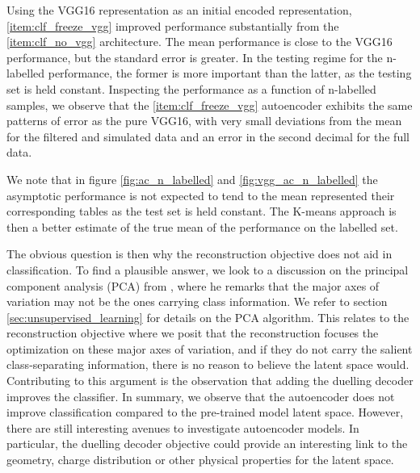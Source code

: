 Using the VGG16 representation as an initial encoded representation, \ref{item:clf_freeze_vgg} improved performance substantially from the \ref{item:clf_no_vgg} architecture. The mean performance is close to the VGG16 performance, but the standard error is greater. In the testing regime for the n-labelled performance, the former is more important than the latter, as the testing set is held constant. Inspecting the performance as a function of n-labelled samples, we observe that the \ref{item:clf_freeze_vgg} autoencoder exhibits the same patterns of error as the pure VGG16, with very small deviations from the mean for the filtered and simulated data and an error in the second decimal for the full data.

We note that in figure \ref{fig:ac_n_labelled} and \ref{fig:vgg_ac_n_labelled} the asymptotic performance is not expected to tend to the mean represented their corresponding tables as the test set is held constant. The K-means approach is then a better estimate of the true mean of the performance on the labelled set.

The obvious question is then why the reconstruction objective does not aid in classification. To find a plausible answer, we look to a discussion on the principal component analysis (PCA) from \cite{Jolliffe1982}, where he remarks that the major axes of variation may not be the ones carrying class information. We refer to section \ref{sec:unsupervised_learning} for details on the PCA algorithm. This relates to the reconstruction objective where we posit that the reconstruction focuses the optimization on these major axes of variation, and if they do not carry the salient class-separating information, there is no reason to believe the latent space would. Contributing to this argument is the observation that adding the duelling decoder improves the classifier. In summary, we observe that the autoencoder does not improve classification compared to the pre-trained model latent space. However, there are still interesting avenues to investigate autoencoder models. In particular, the duelling decoder objective could provide an interesting link to the geometry, charge distribution or other physical properties for the latent space.

